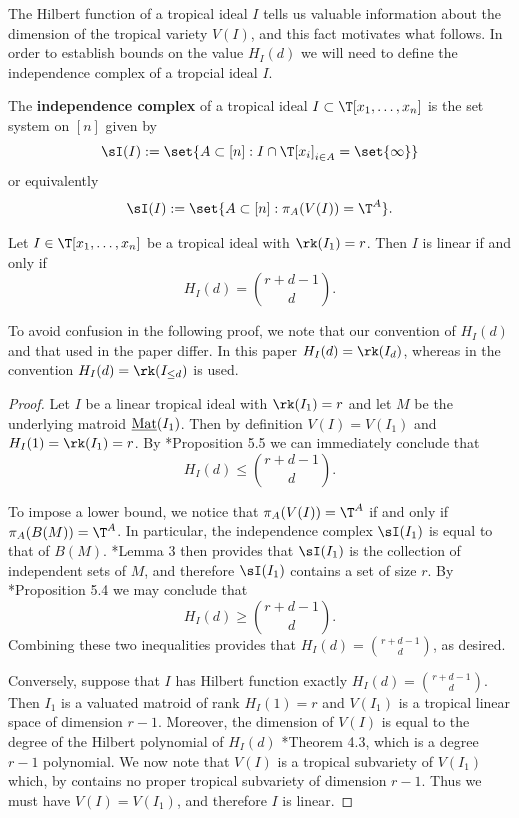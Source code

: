     The Hilbert function of a tropical ideal $I$ tells us valuable information about the dimension of the tropical variety $V(I)$, and this fact motivates what follows. In order to establish bounds on the value $H_I(d)$ we will need to define the independence complex of a tropcial ideal $I$.
\begin{definition}\label{def:independenceComplex}
    The \textbf{independence complex} of a tropical ideal $I\subset\T[x_1,\dots,x_n]$ is the set system on $[n]$ given by
    $$\sI(I):= \set{A\subset [n]: I\cap \T[x_i]_{i\in A} = \set{\infty}}$$
    or equivalently
    $$\sI(I):= \set{A\subset [n]: \pi_{A}(V(I))=\T^{A} }.$$
\end{definition}

    
\begin{proposition}\label{prop:linearHFequiv}
    Let $I\in \T[x_1,\dots,x_n]$ be a tropical ideal with $\rk(I_1)=r$. Then $I$ is linear if and only if
    $$H_I(d)=\binom{r+d-1}{d}.$$
\end{proposition}
To avoid confusion in the following proof, we note that our convention of $H_I(d)$ and that used in the paper \cite{DR19} differ. In this paper $H_I(d)=\rk(I_d)$, whereas in \cite{DR19} the convention $H_I(d)=\rk(I_{\leq d})$ is used.
\begin{proof}
Let $I$ be a linear tropical ideal with $\rk(I_1)=r$ and let $M$ be the underlying matroid $\operatorname{\underline{Mat}}(I_1)$. Then by definition $V(I)=V(I_1)$ and $H_I(1)=\rk(I_1)=r$. By \cite{DR19}*{Proposition 5.5} we can immediately conclude that
$$H_I(d)\leq \binom{r+d-1}{d}.$$

To impose a lower bound, we notice that $\pi_A(V(I))=\T^A$ if and only if $\pi_A(B(M))=\T^A$. In particular, the independence complex $\sI(I_1)$ is equal to that of $B(M)$. \cite{Yu17}*{Lemma 3} then provides that $\sI(I_1)$ is the collection of independent sets of $M$, and therefore $\sI(I_1)$ contains a set of size $r$. By \cite{DR19}*{Proposition 5.4} we may conclude that
$$H_I(d)\geq \binom{r+d-1}{d}.$$ 
Combining these two inequalities provides that $H_I(d)= \binom{r+d-1}{d}$, as desired.

Conversely, suppose that $I$ has Hilbert function exactly $H_I(d)=\binom{r+d-1}{d}$. Then $I_1$ is a valuated matroid of rank $H_I(1)=r$ and $V(I_1)$ is a tropical linear space of dimension $r-1$. Moreover, the dimension of $V(I)$ is equal to the degree of the Hilbert polynomial of $H_I(d)$ \cite{MR20}*{Theorem 4.3}, which is a degree $r-1$ polynomial. We now note that $V(I)$ is a tropical subvariety of $V(I_1)$ which, by  contains no proper tropical subvariety of dimension $r-1$. Thus we must have $V(I)=V(I_1)$, and therefore $I$ is linear.
\end{proof}

